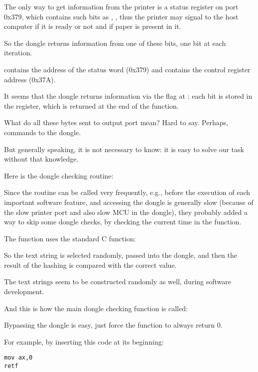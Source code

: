 The only way to get information from the printer is a status register on port 0x379, which contains
such bits as , , \EMDASH{}thus the printer may signal to the host computer
if it is ready or not and if paper is present in it.

So the dongle returns information from one of these bits, one bit at each iteration.

 contains the address of the status word (0x379) and 
 contains the control register address (0x37A).

It seems that the dongle returns information via the  flag at : 
each bit is stored in the  register, which is returned at the end of the function.

What do all these bytes sent to output port mean?
Hard to say. Perhaps, commands to the dongle.

But generally speaking, it is not necessary to know: it is easy to solve our task without that knowledge.

Here is the dongle checking routine:



Since the routine can be called very frequently, e.g., before the execution of each important software feature, 
and accessing the dongle is generally slow (because of the slow printer port and also slow
\ac{MCU} in the dongle), they probably added a way to skip some dongle checks,
by checking the current time in the  function.

The  
function uses the standard C function:



So the text string is selected randomly, passed into the dongle, and then the result of the hashing 
is compared with the correct value.

The text strings seem to be constructed randomly as well, during software development.

And this is how the main dongle checking function is called:



Bypassing the dongle is easy, just force the  function to always return 0.

For example, by inserting this code at its beginning:

\begin{lstlisting}
mov ax,0
retf
\end{lstlisting}

